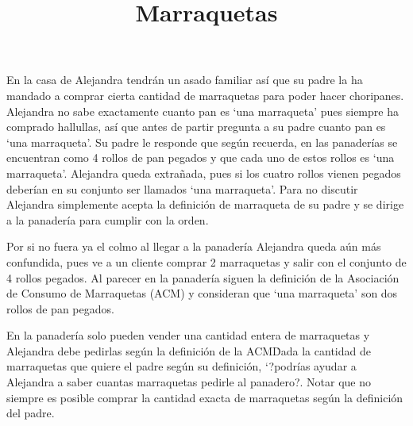 \documentclass{article}
\title{Marraquetas}
\begin{document}
\maketitle

En la casa de Alejandra tendrán un asado familiar así que su padre la ha mandado
a comprar cierta cantidad de marraquetas para poder hacer choripanes. Alejandra
no sabe exactamente cuanto pan es `una marraqueta' pues siempre ha comprado
hallullas, así que antes de partir pregunta a su padre cuanto pan es `una
marraqueta'. Su padre le responde que según recuerda, en las panaderías se
encuentran como 4 rollos de pan pegados y que cada uno de estos rollos es
`una marraqueta'. Alejandra queda extrañada, pues si los cuatro rollos vienen
pegados deberían en su conjunto ser llamados `una marraqueta'. Para no discutir
Alejandra simplemente acepta la definición de marraqueta de su padre y se dirige
a la panadería para cumplir con la orden.

Por si no fuera ya el colmo al llegar a la panadería Alejandra queda aún más
confundida, pues ve a un cliente comprar 2 marraquetas y salir con el conjunto
de 4 rollos pegados. Al parecer en la panadería siguen la definición de la
Asociación de Consumo de Marraquetas (ACM) y consideran que `una marraqueta' son
dos rollos de pan pegados. 

En la panadería solo pueden vender una cantidad entera de marraquetas y
Alejandra debe pedirlas según la definición de la ACM\. Dada la cantidad de
marraquetas que quiere el padre según su definición, `?podrías ayudar a
Alejandra a saber cuantas marraquetas pedirle al panadero?. Notar que no siempre
es posible comprar la cantidad exacta de marraquetas según la definición del
padre.


\end{document}
